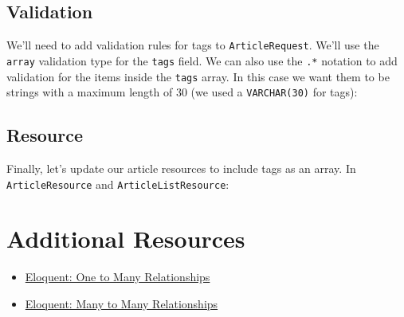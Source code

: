 \subsection{Validation}

We'll need to add validation rules for tags to \texttt{ArticleRequest}. We'll use the \texttt{array} validation type for the \texttt{tags} field. We can also use the \texttt{.*} notation to add validation for the items inside the \texttt{tags} array. In this case we want them to be strings with a maximum length of 30 (we used a \texttt{VARCHAR(30)} for tags):



\subsection{Resource}

Finally, let's update our article resources to include tags as an array. In \texttt{ArticleResource} and \texttt{ArticleListResource}:




\section{Additional Resources}

\begin{itemize}[leftmargin=*]
    \item \href{http://laravel.com/docs/master/eloquent-relationships#one-to-many}{Eloquent: One to Many Relationships}
    \item \href{http://laravel.com/docs/master/eloquent-relationships#many-to-many}{Eloquent: Many to Many Relationships}
\end{itemize}
